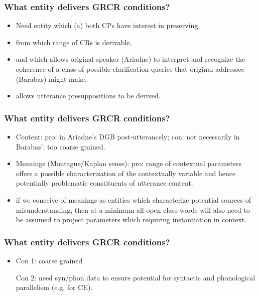\documentclass{beamer}
\newcommand{\bit}{\begin{itemize}}
\newcommand{\eit}{\end{itemize}}
\begin{document}
\begin{frame}\frametitle{What entity delivers GRCR conditions?
}

\bit

\item Need entity which (a) both CPs have interest in preserving,

\item from which range of CRs is derivable, 
\item and which
allows original speaker (Ariadne) to 
interpret and recognize the coherence of a class of possible
clarification queries that original addressee (Barabas) might make.

\item allows utterance presuppositions to be derived.
\eit

\end{frame}

\begin{frame}\frametitle{What entity delivers GRCR conditions?
}

\bit

\item Content: pro: in Ariadne's  DGB post-utterancely; con: not necessarily in Barabas'; too coarse grained.

\item Meanings (Montague/Kaplan sense): pro:  range of contextual parameters offers a possible
characterization of the contextually variable and hence potentially
problematic constituents of utterance content.

\item if we conceive of
meanings as entities which characterize potential sources of
misunderstanding, then at a minimum all open class words
 will also need to be assumed to project parameters
which requiring instantiation in context.
\eit

\end{frame}

\begin{frame}\frametitle{What entity delivers GRCR conditions?
}

\bit



\item Con 1: coarse grained


Con 2: need syn/phon data to ensure potential for syntactic and
phonological parallelism (e.g. for CE).



\eit

\end{frame}
\end{document}
